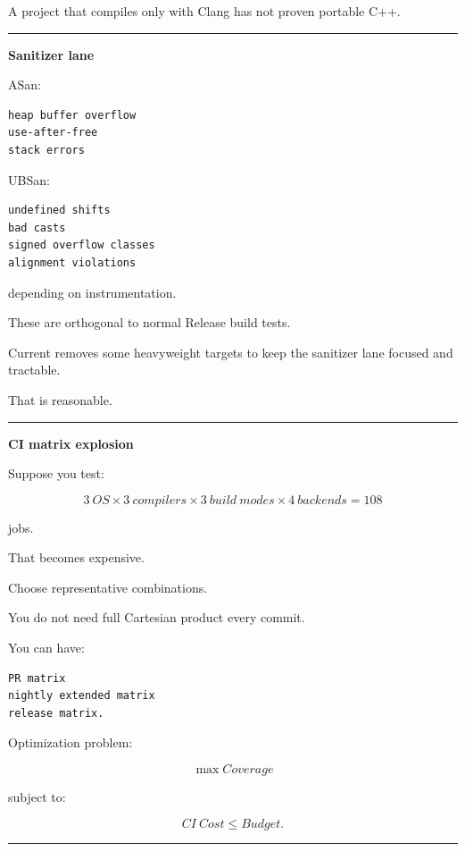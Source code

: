 A project that compiles only with Clang has not proven portable C++.

\begin{center}\rule{0.5\linewidth}{0.5pt}\end{center}

\textbf{Sanitizer lane}

ASan:

\begin{verbatim}
heap buffer overflow
use-after-free
stack errors
\end{verbatim}

UBSan:

\begin{verbatim}
undefined shifts
bad casts
signed overflow classes
alignment violations
\end{verbatim}

depending on instrumentation.

These are orthogonal to normal Release build tests.

Current  removes some heavyweight targets to keep the sanitizer lane focused and tractable.

That is reasonable.

\begin{center}\rule{0.5\linewidth}{0.5pt}\end{center}

\textbf{CI matrix explosion}

Suppose you test:

\[
3\ OS
\times
3\ compilers
\times
3\ build\ modes
\times
4\ backends
=
108
\]

jobs.

That becomes expensive.

Choose representative combinations.

You do not need full Cartesian product every commit.

You can have:

\begin{verbatim}
PR matrix
nightly extended matrix
release matrix.
\end{verbatim}

Optimization problem:

\[
\max Coverage
\]

subject to:

\[
CI\ Cost\le Budget.
\]

\begin{center}\rule{0.5\linewidth}{0.5pt}\end{center}

